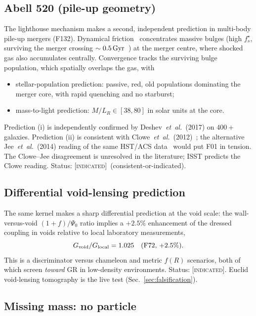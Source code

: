 \documentclass[aps,prd,twocolumn,nofootinbib,floatfix,superscriptaddress]{revtex4-2}
\newcommand{\INDIC}{{\color{black!60!yellow}\textsc{[indicated]}}}
\begin{document}
\subsection{Abell 520 (pile-up geometry)}
\label{sec:a520}

The lighthouse mechanism makes a second, independent prediction in
multi-body pile-up mergers (F132). Dynamical
friction~\cite{ChandrasekharDF,BinneyTremaine2008} concentrates
massive bulges (high $f_s^\star$, surviving the merger crossing
$\sim 0.5\,{\rm Gyr}$~\cite{Loubser2020}) at the merger centre, where
shocked gas also accumulates centrally. Convergence tracks the surviving bulge
population, which spatially overlaps the gas, with
\begin{itemize}
\item[(i)] stellar-population prediction: passive, red,
old populations dominating the merger core, with rapid quenching and
no starburst;
\item[(ii)] mass-to-light prediction: $M/L_R \in [38,80]$ in solar
units at the core.
\end{itemize}
Prediction (i) is independently confirmed by Deshev~\emph{et~al.}~(2017)
\cite{Deshev2017} on $400+$ galaxies. Prediction (ii) is consistent
with Clowe~\emph{et~al.}~(2012)~\cite{Clowe2012}; the alternative
Jee~\emph{et~al.}~(2014) reading of the same HST/ACS
data~\cite{Jee2014} would put F01 in tension. The Clowe--Jee
disagreement is unresolved in the literature; ISST predicts the
Clowe reading. Status: \INDIC\ (consistent-or-indicated).

\subsection{Differential void-lensing prediction}

The same kernel makes a sharp differential prediction at the
void scale: the wall-versus-void $(1+f)/\Psi_0$ ratio implies a
$+2.5\%$ enhancement of the dressed coupling in voids relative to
local laboratory measurements,
\begin{equation}
G_{\rm void}/G_{\rm local} = 1.025\quad (\text{F72, +2.5\%}).
\end{equation}
This is a discriminator versus chameleon and metric $f(R)$ scenarios,
both of which screen \emph{toward} GR in low-density environments.
Status: \INDIC. Euclid void-lensing tomography is the live test
(Sec.~\ref{sec:falsification}).

\subsection{Missing mass: no particle}
\end{document}
